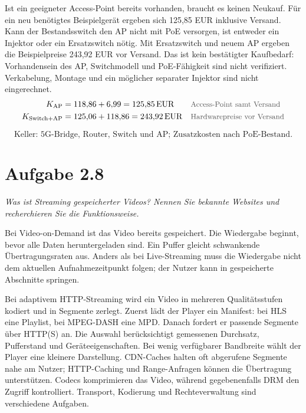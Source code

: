 \documentclass[a4paper,11pt]{article}
\newif\ifexplain
\newcommand{\aufgabe}[1]{\section*{Aufgabe #1}}
\newcommand{\angabe}[1]{{\raggedright\textit{#1}\par}\smallskip}
\newcommand{\why}[1]{\text{\small\color{black!65}#1}}
\newcommand{\explain}[1]{\ifexplain\begin{erklbox}#1\end{erklbox}\fi}
\begin{document}
Ist ein geeigneter Access-Point bereits vorhanden, braucht es keinen Neukauf. Für ein neu benötigtes Beispielgerät ergeben sich 125,85 EUR inklusive Versand. Kann der Bestandsswitch den AP nicht mit PoE versorgen, ist entweder ein Injektor oder ein Ersatzswitch nötig. Mit Ersatzswitch und neuem AP ergeben die Beispielpreise 243,92 EUR vor Versand. Das ist kein bestätigter Kaufbedarf: Vorhandensein des AP, Switchmodell und PoE-Fähigkeit sind nicht verifiziert. Verkabelung, Montage und ein möglicher separater Injektor sind nicht eingerechnet.
\begin{align*}
K_{\mathrm{AP}}&=118{,}86+6{,}99=125{,}85\,\mathrm{EUR} &&\why{Access-Point samt Versand}\\
K_{\mathrm{Switch+AP}}&=125{,}06+118{,}86=243{,}92\,\mathrm{EUR} &&\why{Hardwarepreise vor Versand}
\end{align*}
\explain{Der Lite 8 PoE hat laut Hersteller vier PoE+-Ports und ein Budget von 52 W; der U6+ benötigt laut Hersteller 9 W. Das Beispiel kann den Access-Point daher versorgen. Ob der vorhandene Switch dasselbe kann, ist nicht bekannt. Der UCG-Ultra ist bereits vorhanden und wird in den möglichen Zusatzkosten nicht noch einmal eingerechnet.}
\[\boxed{\text{Keller: 5G-Bridge, Router, Switch und AP; Zusatzkosten nach PoE-Bestand.}}\]

\aufgabe{2.8}
\angabe{Was ist Streaming gespeicherter Videos? Nennen Sie bekannte Websites und recherchieren Sie die Funktionsweise.}
Bei Video-on-Demand ist das Video bereits gespeichert. Die Wiedergabe beginnt, bevor alle Daten heruntergeladen sind. Ein Puffer gleicht schwankende Übertragungsraten aus. Anders als bei Live-Streaming muss die Wiedergabe nicht dem aktuellen Aufnahmezeitpunkt folgen; der Nutzer kann in gespeicherte Abschnitte springen.

Bei adaptivem HTTP-Streaming wird ein Video in mehreren Qualitätsstufen kodiert und in Segmente zerlegt. Zuerst lädt der Player ein Manifest: bei HLS eine Playlist, bei MPEG-DASH eine MPD. Danach fordert er passende Segmente über HTTP(S) an. Die Auswahl berücksichtigt gemessenen Durchsatz, Pufferstand und Geräteeigenschaften. Bei wenig verfügbarer Bandbreite wählt der Player eine kleinere Darstellung. CDN-Caches halten oft abgerufene Segmente nahe am Nutzer; HTTP-Caching und Range-Anfragen können die Übertragung unterstützen. Codecs komprimieren das Video, während gegebenenfalls DRM den Zugriff kontrolliert. Transport, Kodierung und Rechteverwaltung sind verschiedene Aufgaben.
\end{document}
